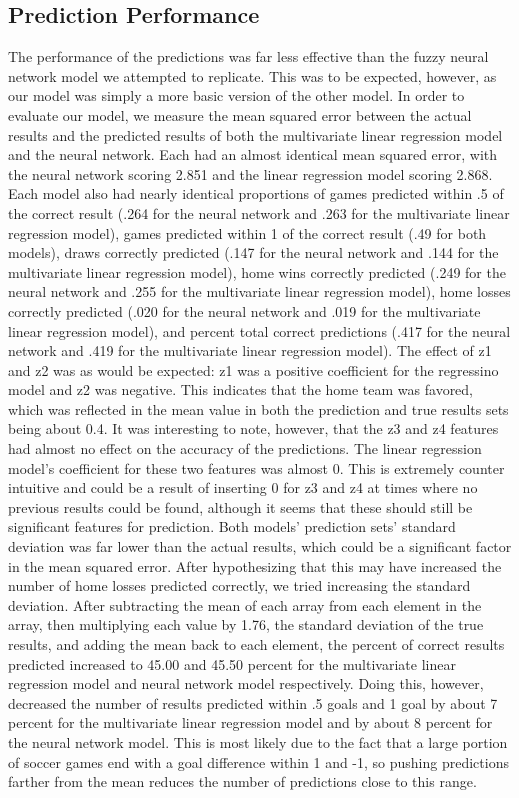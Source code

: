 \documentclass[sigconf]{acmart}
\begin{document}
\subsection{Prediction Performance}
The performance of the predictions was far less effective than the fuzzy neural network model we attempted to replicate. This was to be expected, however, as our model was simply a more basic version of the other model. In order to evaluate our model, we measure the mean squared error between the actual results and the predicted results of both the multivariate linear regression model and the neural network. Each had an almost identical mean squared error, with the neural network scoring 2.851 and the linear regression model scoring 2.868. Each model also had nearly identical proportions of games predicted within .5 of the correct result (.264 for the neural network and .263 for the multivariate linear regression model), games predicted within 1 of the correct result (.49 for both models), draws correctly predicted (.147 for the neural network and .144 for the multivariate linear regression model), home wins correctly predicted (.249 for the neural network and .255 for the multivariate linear regression model), home losses correctly predicted (.020 for the neural network and .019 for the multivariate linear regression model), and percent total correct predictions (.417 for the neural network and .419 for the multivariate linear regression model). The effect of z1 and z2 was as would be expected: z1 was a positive coefficient for the regressino model and z2 was negative. This indicates that the home team was favored, which was reflected in the mean value in both the prediction and true results sets being about 0.4. It was interesting to note, however, that the z3 and z4 features had almost no effect on the accuracy of the predictions. The linear regression model's coefficient for these two features was almost 0. This is extremely counter intuitive and could be a result of inserting 0 for z3 and z4 at times where no previous results could be found, although it seems that these should still be significant features for prediction. Both models' prediction sets' standard deviation was far lower than the actual results, which could be a significant factor in the mean squared error. After hypothesizing that this may have increased the number of home losses predicted correctly, we tried increasing the standard deviation. After subtracting the mean of each array from each element in the array, then multiplying each value by 1.76, the standard deviation of the true results, and adding the mean back to each element, the percent of correct results predicted increased to 45.00 and 45.50 percent for the multivariate linear regression model and neural network model respectively. Doing this, however, decreased the number of results predicted within .5 goals and 1 goal by about 7 percent for the multivariate linear regression model and by about 8 percent for the neural network model. This is most likely due to the fact that a large portion of soccer games end with a goal difference within 1 and -1, so pushing predictions farther from the mean reduces the number of predictions close to this range.
\end{document}
